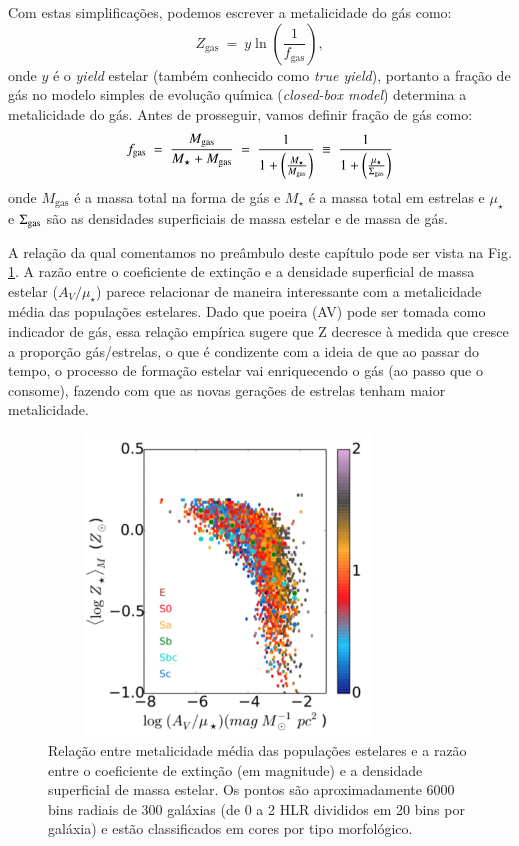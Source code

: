 Com estas simplificações, podemos escrever a metalicidade do gás como:
\begin{equation}
	Z_{\mathrm{gas}}\ =\ y \ln \left(\frac{1}{f_{\mathrm{gas}}}\right),
	\label{eq:Zgas_closedbox}
\end{equation}
\noindent onde $y$ é o {\em yield} estelar (também conhecido como {\em true yield}), portanto a
fração de gás no modelo simples de evolução química ({\em closed-box model}) determina a
metalicidade do gás. Antes de prosseguir, vamos definir fração de gás como:
\begin{equation}
	f_{\mathrm{gas}}\ =\ \frac{M_{\mathrm{gas}}}{M_\star + M_{\mathrm{gas}}}\ =\ \frac{1}{1 +
	\left(\frac{M_\star}{M_{\mathrm{gas}}}\right)}\ \equiv\ \frac{1}{1 +
	\left(\frac{\mu_\star}{\SigmaGas}\right)}
	\label{eq:fgas}
\end{equation}
\noindent onde $M_{\mathrm{gas}}$ é a massa total na forma de gás e $M_\star$ é a massa total em
estrelas e $\mu_\star$ e $\Sigma_{\mathrm{gas}}$ são as densidades superficiais de massa estelar e de massa de
gás.

A relação da qual comentamos no preâmbulo deste capítulo pode ser vista na Fig.
\ref{fig:dust2stars}. A razão entre o coeficiente de extinção e a densidade superficial de massa
estelar ($A_V / \mu_\star$) parece relacionar de maneira interessante com a metalicidade média das
populações estelares. Dado que poeira (AV) pode ser tomada como indicador de gás, essa relação
empírica sugere que Z decresce à medida que cresce a proporção gás/estrelas, o que é condizente com
a ideia de que ao passar do tempo, o processo de formação estelar vai enriquecendo o gás (ao passo
que o consome), fazendo com que as novas gerações de estrelas tenham maior metalicidade.
 
\begin{figure}
	\centering
	\includegraphics[height = 8cm, width = 9.5cm]{figuras/dust2stars.pdf}
	\caption[$A_V / \mu_\star$ vs. ]
	{Relação entre metalicidade média das populações estelares e a razão entre o coeficiente de
extinção (em magnitude) e a densidade superficial de massa estelar. Os pontos são aproximadamente
6000 bins radiais de 300 galáxias (de 0 a 2 HLR divididos em 20 bins por galáxia) e estão
classificados em cores por tipo morfológico.}
	\label{fig:dust2stars}
\end{figure} 

